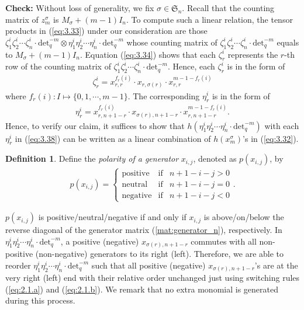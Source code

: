 \documentclass[table,a4paper,reqno]{amsart}
\numberwithin{equation}{section}
\theoremstyle{definition}
\newtheorem{definition}[theorem]{Definition}
\begin{document}
\textbf{Check:} Without loss of generality, we fix $\sigma\in\mathfrak{S}_n$. Recall that the counting matrix of $z_m^\sigma$ is $M_\sigma+(m-1)I_n$. To compute such a linear relation, the tensor products in (\ref{eq:3.33}) under our consideration are those $\zeta^i_1\zeta^i_2\cdots \zeta^i_n\cdot\text{det}_q^{-m}\otimes \eta^i_1\eta^i_2\cdots \eta^i_n\cdot\text{det}_q^{-m}$ whose counting matrix of $\zeta^i_1\zeta^i_2\cdots \zeta^i_n\cdot\text{det}_q^{-m}$ equals to $M_\sigma+(m-1)I_n$. Equation (\ref{eq:3.34}) shows that each $\zeta^i_r$ represents the $r$-th row of the counting matrix of $\zeta^i_1\zeta^i_2\cdots \zeta^i_n\cdot\text{det}_q^{-m}$. Hence, each $\zeta^i_r$ is in the form of 
\begin{align}\label{eq:3.37}
    \zeta^i_r=x_{r,r}^{f_r(i)}\cdot x_{r,\sigma(r)}\cdot x_{r,r}^{m-1-f_r(i)}
\end{align}
where $f_r(i):I\mapsto \{0,1,\cdots,m-1\}$. The corresponding $\eta^i_r$ is in the form of
\begin{align}\label{eq:3.38}
    \eta^i_r=x_{r,n+1-r}^{f_r(i)}\cdot x_{\sigma(r),n+1-r}\cdot x_{r,n+1-r}^{m-1-f_r(i)}.
\end{align}
Hence, to verify our claim, it suffices to show that $h(\eta^i_1\eta^i_2\cdots \eta^i_n\cdot\text{det}_q^{-m})$ with each $\eta^i_r$ in (\ref{eq:3.38}) can be written as a linear combination of $h(x_m^\sigma)$'s in (\ref{eq:3.32}). 
\begin{definition}
    Define the \textit{polarity of a generator} $x_{i,j}$, denoted as $p(x_{i,j})$, by
    \begin{align}
        p(x_{i,j})=\left\{ \begin{array}{ccl}
        \text{positive} & \mbox{if}
        & n+1-i-j>0\\ \text{neutral} & \mbox{if}
        & n+1-i-j=0\\ \text{negative} & \mbox{if}
        & n+1-i-j<0
        \end{array}\right..
    \end{align}
\end{definition}
$p(x_{i,j})$ is positive/neutral/negative if and only if $x_{i,j}$ is above/on/below the reverse diagonal of the generator matrix (\ref{mat:generator_n}), respectively. In $\eta^i_1\eta^i_2\cdots \eta^i_n\cdot\text{det}_q^{-m}$, a positive (negative) $x_{\sigma(r), n+1-r}$ commutes with all non-positive (non-negative) generators to its right (left). Therefore, we are able to reorder $\eta^i_1\eta^i_2\cdots \eta^i_n\cdot\text{det}_q^{-m}$ such that all positive (negative) $x_{\sigma(r), n+1-r}$'s are at the very right (left) end with their relative order unchanged just using switching rules (\ref{eq:2.1.a}) and (\ref{eq:2.1.b}). We remark that no extra monomial is generated during this process.
\end{document}
